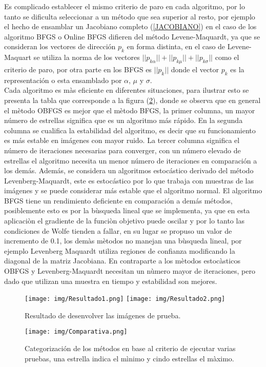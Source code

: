 Es complicado establecer el mismo criterio de paro en cada algoritmo, por lo tanto se dificulta seleccionar a un método que sea superior al resto, por  ejemplo el hecho de ensamblar un Jacobiano completo (\ref{JACOBIANO}) en el caso de los algoritmo BFGS o Online BFGS difieren del método Levene-Maquardt, ya que se consideran los vectores de dirección $p_k$  en forma distinta, en el caso de Levene-Maquart se utiliza la norma de los vectores $ || p_{k \alpha} || + || p_{k \mu} || + || p_{k \sigma} || $ como el criterio de paro, por otra parte en los BFGS es $ || p_{k}  || $ donde el vector $p_k$ es la representación o esta ensamblado por $\alpha$, $\mu$ y $\sigma$.\\
%
Cada algoritmo es m\`as eficiente en diferentes situaciones, para ilustrar esto se presenta la tabla que corresponde a la figura (\ref{Comparativa}), donde se observa que en general el m\`etodo OBFGS es mejor que el m\`etodo BFGS, la primer columna, un mayor número de estrellas significa que es un algoritmo más rápido.
%
En la segunda columna se cualifica la estabilidad del algoritmo, es decir que su funcionamiento es más estable en imágenes con mayor ruido.
%
La tercer columna significa el número de iteraciones necesarias para converger, con un número elevado de estrellas el algoritmo necesita un menor número de iteraciones en comparación a los demás.
%
Además, se considera un algoritmos estocástico derivado del método Levenberg-Maquardt, este es estocástico por lo que trabaja con  muestras de las imágenes y se puede considerar más estable que el algoritmo normal.
%
El algoritmo BFGS tiene un rendimiento deficiente en comparación a demás métodos, posiblemente esto es por la b\`usqueda lineal que se implementa, ya que en esta aplicaci\`on el gradiente de la funci\`on objetivo puede oscilar y por lo tanto las condiciones de Wolfe tienden a fallar, en su lugar se propuso un valor de incremento de 0.1, los dem\`as m\`etodos no manejan una b\`usqueda lineal, por ejemplo Levenberg Maquardt utiliza regiones de confianza modificando la diagonal de la matriz Jacobiana.  
%
En contraparte a los m\`etodos estoc\`asticos OBFGS y Levenberg-Maquardt necesitan un n\`umero mayor de iteraciones, pero dado que utilizan una muestra en tiempo y estabilidad son mejores.
\begin{figure}[H]\label{Resultados} 
	\centering
	\texttt{[image: img/Resultado1.png]}
	\texttt{[image: img/Resultado2.png]}
		\caption{Resultado de desenvolver las imágenes de prueba.}
\end{figure}
\begin{figure}[H] \label{Comparativa}
	\centering
	\texttt{[image: img/Comparativa.png]}
	\caption{Categorización de los métodos en base al criterio de ejecutar varias pruebas, una estrella indica el m\`inimo y cindo estrellas el m\`aximo.}
\end{figure}

